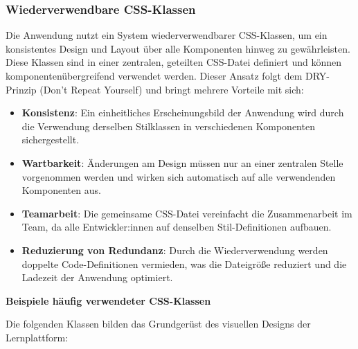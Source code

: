 \subsubsection{Wiederverwendbare CSS-Klassen}

Die Anwendung nutzt ein System wiederverwendbarer CSS-Klassen, um ein konsistentes Design und Layout über alle Komponenten hinweg zu gewährleisten. Diese Klassen sind in einer zentralen, geteilten CSS-Datei definiert und können komponentenübergreifend verwendet werden. Dieser Ansatz folgt dem DRY-Prinzip (Don't Repeat Yourself) und bringt mehrere Vorteile mit sich:

\begin{itemize}
    \item \textbf{Konsistenz}: Ein einheitliches Erscheinungsbild der Anwendung wird durch die Verwendung derselben Stilklassen in verschiedenen Komponenten sichergestellt.
    \item \textbf{Wartbarkeit}: Änderungen am Design müssen nur an einer zentralen Stelle vorgenommen werden und wirken sich automatisch auf alle verwendenden Komponenten aus.
    \item \textbf{Teamarbeit}: Die gemeinsame CSS-Datei vereinfacht die Zusammenarbeit im Team, da alle Entwickler:innen auf denselben Stil-Definitionen aufbauen.
    \item \textbf{Reduzierung von Redundanz}: Durch die Wiederverwendung werden doppelte Code-Definitionen vermieden, was die Dateigröße reduziert und die Ladezeit der Anwendung optimiert.
\end{itemize}

\textbf{Beispiele häufig verwendeter CSS-Klassen}

Die folgenden Klassen bilden das Grundgerüst des visuellen Designs der Lernplattform:

